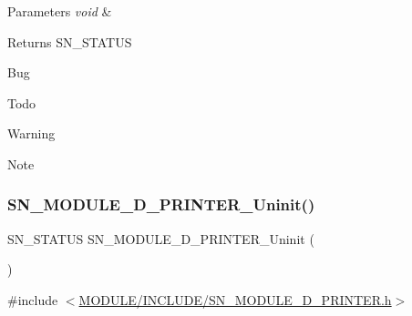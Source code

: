 \begin{DoxyParams}{Parameters}
{\em void} & \\
\hline
\end{DoxyParams}
\begin{DoxyReturn}{Returns}
S\+N\+\_\+\+S\+T\+A\+T\+US 
\end{DoxyReturn}
\begin{DoxyRefDesc}{Bug}
\item[\hyperlink{bug__bug000005}{Bug}]\end{DoxyRefDesc}
\begin{DoxyRefDesc}{Todo}
\item[\hyperlink{todo__todo000005}{Todo}]\end{DoxyRefDesc}
\begin{DoxyWarning}{Warning}

\end{DoxyWarning}
\begin{DoxyNote}{Note}

\end{DoxyNote}
\mbox{\label{group__PRINTER_ga776f5e31b0c0e176e35669f9432baec0}} 
\subsubsection{\texorpdfstring{S\+N\+\_\+\+M\+O\+D\+U\+L\+E\+\_\+D\+\_\+\+P\+R\+I\+N\+T\+E\+R\+\_\+\+Uninit()}{SN\_MODULE\_3D\_PRINTER\_Uninit()}}
{\footnotesize\ttfamily S\+N\+\_\+\+S\+T\+A\+T\+US S\+N\+\_\+\+M\+O\+D\+U\+L\+E\+\_\+D\+\_\+\+P\+R\+I\+N\+T\+E\+R\+\_\+\+Uninit (\begin{DoxyParamCaption}\item[{void}]{ }\end{DoxyParamCaption})}



{\ttfamily \#include $<$\hyperlink{SN__MODULE__3D__PRINTER_8h}{M\+O\+D\+U\+L\+E/\+I\+N\+C\+L\+U\+D\+E/\+S\+N\+\_\+\+M\+O\+D\+U\+L\+E\+\_\+D\+\_\+\+P\+R\+I\+N\+T\+E\+R.\+h}$>$}


